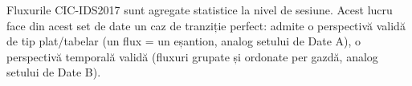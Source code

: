 Fluxurile CIC-IDS2017 sunt agregate statistice la nivel de sesiune. Acest lucru face din acest set de date un caz de tranziție perfect: admite o perspectivă validă de tip plat/tabelar (un flux = un eșantion, analog setului de Date A), o perspectivă temporală validă (fluxuri grupate și ordonate per gazdă, analog setului de Date B).